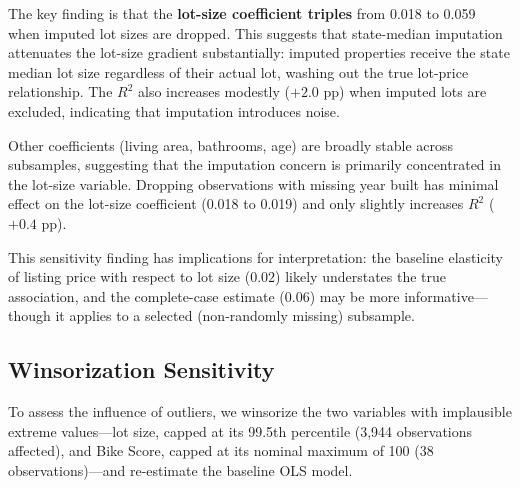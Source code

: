 The key finding is that the \textbf{lot-size coefficient triples} from 0.018 to 0.059 when imputed lot sizes are dropped. This suggests that state-median imputation attenuates the lot-size gradient substantially: imputed properties receive the state median lot size regardless of their actual lot, washing out the true lot-price relationship. The $R^2$ also increases modestly ($+2.0$ pp) when imputed lots are excluded, indicating that imputation introduces noise.

Other coefficients (living area, bathrooms, age) are broadly stable across subsamples, suggesting that the imputation concern is primarily concentrated in the lot-size variable. Dropping observations with missing year built has minimal effect on the lot-size coefficient (0.018 to 0.019) and only slightly increases $R^2$ ($+0.4$ pp).

This sensitivity finding has implications for interpretation: the baseline elasticity of listing price with respect to lot size ($0.02$) likely understates the true association, and the complete-case estimate ($0.06$) may be more informative---though it applies to a selected (non-randomly missing) subsample.


\subsection{Winsorization Sensitivity}
\label{sec:winsorization}

To assess the influence of outliers, we winsorize the two variables with implausible extreme values---lot size, capped at its 99.5th percentile (3,944 observations affected), and Bike Score, capped at its nominal maximum of 100 (38 observations)---and re-estimate the baseline OLS model.

